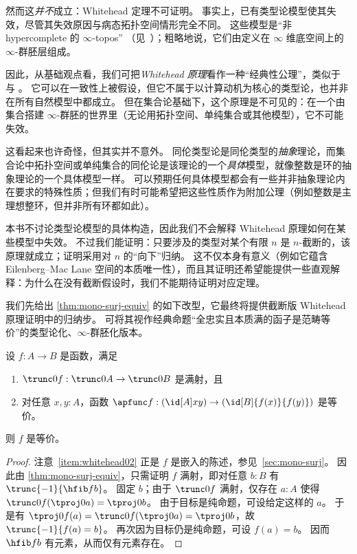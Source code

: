 然而这\emph{并不}成立：Whitehead 定理不可证明。
事实上，已有类型论模型使其失效，尽管其失效原因与病态拓扑空间情形完全不同。
这些模型是“非 hypercomplete 的 $\infty$-topos”
%
%
（见~\cite{lurie:higher-topoi}）；粗略地说，它们由定义在 $\infty$ 维底空间上的 $\infty$-群胚层组成。

%
%

因此，从基础观点看，我们可把\emph{Whitehead 原理}看作一种“经典性公理”，类似于 \LEM{} 与 \choice{}。
它可以在一致性上被假设，但它不属于以计算动机为核心的类型论，也并非在所有自然模型中都成立。
但在集合论基础下，这个原理是不可见的：在一个由集合搭建 $\infty$-群胚的世界里（无论用拓扑空间、单纯集合或其他模型），它不可能失效。

这看起来也许奇怪，但其实并不意外。
同伦类型论是同伦类型的\emph{抽象}理论，而集合论中拓扑空间或单纯集合的同伦论是该理论的一个\emph{具体}模型，就像整数是环的抽象理论的一个具体模型一样。
可以预期任何具体模型都会有一些并非抽象理论内在要求的特殊性质；但我们有时可能希望把这些性质作为附加公理（例如整数是主理想整环，但并非所有环都如此）。

本书不讨论类型论模型的具体构造，因此我们不会解释 Whitehead 原理如何在某些模型中失效。
不过我们能证明：只要涉及的类型对某个有限 $n$ 是 $n$-截断的，该原理就成立；证明采用对 $n$ 的“向下”归纳。
这不仅本身有意义（例如它蕴含 Eilenberg--Mac Lane 空间的本质唯一性），而且其证明还希望能提供一些直观解释：为什么在没有截断假设时，我们不能期待证明对应定理。

我们先给出 \cref{thm:mono-surj-equiv} 的如下改型，它最终将提供截断版 Whitehead 原理证明中的归纳步。
可将其视作经典命题“全忠实且本质满的函子是范畴等价”的类型论化、$\infty$-群胚化版本。

\begin{thm}\label{thm:whitehead0}
  设 $f:A\to B$ 是函数，满足
  \begin{enumerate}
  \item $\trunc0 f : \trunc0 A \to \trunc0 B$ 是满射，且\label{item:whitehead01}
  \item 对任意 $x,y:A$，函数 $\apfunc f : (\id[A]xy) \to (\id[B]{f(x)}{f(y)})$ 是等价。\label{item:whitehead02}
  \end{enumerate}
  则 $f$ 是等价。
\end{thm}
\begin{proof}
  注意~\ref{item:whitehead02} 正是 $f$ 是嵌入的陈述，参见~\cref{sec:mono-surj}。
  因此由 \cref{thm:mono-surj-equiv}，只需证明 $f$ 满射，即对任意 $b:B$ 有 $\trunc{-1}{\hfib f b}$。
  固定 $b$；由于 $\trunc0 f$ 满射，仅存在 $a:A$ 使得 $\trunc 0 f(\tproj0a) = \tproj0b$。
  由于目标是纯命题，可设给定这样的 $a$。
  于是有 $\tproj0{f(a)} = \trunc 0 f(\tproj0a) =\tproj0b$，故 $\trunc{-1}{f(a)=b}$。
  再次因为目标仍是纯命题，可设 $f(a)=b$。
  因而 $\hfib f b$ 有元素，从而仅有元素存在。
\end{proof}

